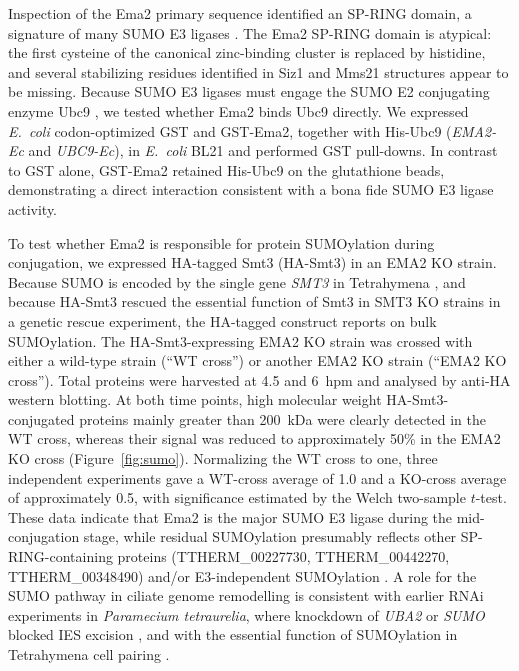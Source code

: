 \documentclass[11pt]{article}
\begin{document}
Inspection of the Ema2 primary sequence identified an SP-RING domain, a
signature of many SUMO E3 ligases \citep{hochstrasser2001spring}. The
Ema2 SP-RING domain is atypical: the first cysteine of the canonical
zinc-binding cluster is replaced by histidine, and several stabilizing
residues identified in Siz1 and Mms21 structures
\citep{yunus2009siz1,duan2009mms21} appear to be missing. Because SUMO
E3 ligases must engage the SUMO E2 conjugating enzyme Ubc9
\citep{sampson2001sumo}, we tested whether Ema2 binds Ubc9 directly.
We expressed \emph{E.~coli} codon-optimized GST and GST-Ema2, together
with His-Ubc9 (\emph{EMA2-Ec} and \emph{UBC9-Ec}), in \emph{E.~coli} BL21
and performed GST pull-downs. In contrast to GST alone, GST-Ema2 retained
His-Ubc9 on the glutathione beads, demonstrating a direct interaction
consistent with a bona fide SUMO E3 ligase activity.

To test whether Ema2 is responsible for protein SUMOylation during
conjugation, we expressed HA-tagged Smt3 (HA-Smt3) in an EMA2 KO strain.
Because SUMO is encoded by the single gene \emph{SMT3} in Tetrahymena
\citep{nasir2015sumo}, and because HA-Smt3 rescued the essential function
of Smt3 in SMT3 KO strains in a genetic rescue experiment, the HA-tagged
construct reports on bulk SUMOylation. The HA-Smt3-expressing EMA2 KO
strain was crossed with either a wild-type strain (``WT cross'') or
another EMA2 KO strain (``EMA2 KO cross''). Total proteins were harvested
at 4.5 and 6~hpm and analysed by anti-HA western blotting. At both time
points, high molecular weight HA-Smt3-conjugated proteins mainly greater
than 200~kDa were clearly detected in the WT cross, whereas their signal
was reduced to approximately 50\% in the EMA2 KO cross
(Figure~\ref{fig:sumo}). Normalizing the WT cross to one, three
independent experiments gave a WT-cross average of 1.0 and a KO-cross
average of approximately 0.5, with significance estimated by the Welch
two-sample $t$-test. These data indicate that Ema2 is the major SUMO E3
ligase during the mid-conjugation stage, while residual SUMOylation
presumably reflects other SP-RING-containing proteins
(TTHERM\_00227730, TTHERM\_00442270, TTHERM\_00348490) and/or
E3-independent SUMOylation \citep{sampson2001sumo}. A role for the SUMO
pathway in ciliate genome remodelling is consistent with earlier RNAi
experiments in \emph{Paramecium tetraurelia}, where knockdown of
\emph{UBA2} or \emph{SUMO} blocked IES excision \citep{matsuda2006sumo},
and with the essential function of SUMOylation in Tetrahymena cell
pairing \citep{nasir2015sumo}.
\end{document}
